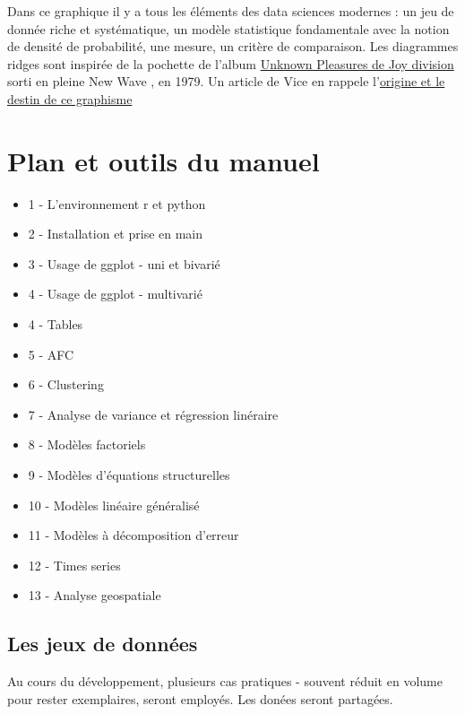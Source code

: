 \documentclass[
]{book}
\providecommand{\tightlist}{%
  \setlength{\itemsep}{0pt}\setlength{\parskip}{0pt}}
\begin{document}
Dans ce graphique il y a tous les éléments des data sciences modernes : un jeu de donnée riche et systématique, un modèle statistique fondamentale avec la notion de densité de probabilité, une mesure, un critère de comparaison. Les diagrammes ridges sont inspirée de la pochette de l'album \href{https://www.youtube.com/watch?v=7PtvIr2oiaE}{Unknown Pleasures de Joy division} sorti en pleine New Wave , en 1979. Un article de Vice en rappele l'\href{https://i-d.vice.com/fr/article/pabjam/pourquoi-cette-pochette-dalbum-de-joy-division-a-inspire-le-monde-entier}{origine et le destin de ce graphisme}

\hypertarget{plan-et-outils-du-manuel}{%
\chapter{Plan et outils du manuel}\label{plan-et-outils-du-manuel}}

\begin{itemize}
\tightlist
\item
  1 - L'environnement r et python
\item
  2 - Installation et prise en main
\item
  3 - Usage de ggplot - uni et bivarié
\item
  4 - Usage de ggplot - multivarié
\item
  4 - Tables
\item
  5 - AFC
\item
  6 - Clustering
\item
  7 - Analyse de variance et régression linéraire
\item
  8 - Modèles factoriels
\item
  9 - Modèles d'équations structurelles
\item
  10 - Modèles linéaire généralisé
\item
  11 - Modèles à décomposition d'erreur
\item
  12 - Times series
\item
  13 - Analyse geospatiale
\end{itemize}

\hypertarget{les-jeux-de-donnuxe9es}{%
\section{Les jeux de données}\label{les-jeux-de-donnuxe9es}}

Au cours du développement, plusieurs cas pratiques - souvent réduit en volume pour rester exemplaires, seront employés. Les donées seront partagées.
\end{document}
